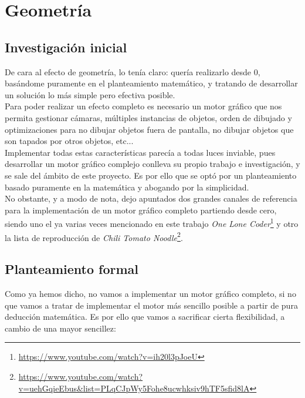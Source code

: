 \section{Geometría}


\subsection{Investigación inicial}

De cara al efecto de geometría, lo tenía claro: quería realizarlo desde 0, basándome puramente en el planteamiento matemático, y tratando de desarrollar un solución lo más simple pero efectiva posible.\\

Para poder realizar un efecto completo es necesario un motor gráfico que nos permita gestionar cámaras, múltiples instancias de objetos, orden de dibujado y optimizaciones para no dibujar objetos fuera de pantalla, no dibujar objetos que son tapados por otros objetos, etc...\\

Implementar todas estas características parecía a todas luces inviable, pues desarrollar un motor gráfico complejo conlleva su propio trabajo e investigación, y se sale del ámbito de este proyecto. Es por ello que se optó por un planteamiento basado puramente en la matemática y abogando por la simplicidad.\\

No obstante, y a modo de nota, dejo apuntados dos grandes canales de referencia para la implementación de un motor gráfico completo partiendo desde cero, siendo uno el ya varias veces mencionado en este trabajo \emph{One Lone Coder}\footnote{\url{https://www.youtube.com/watch?v=ih20l3pJoeU}} y otro la lista de reproducción de \emph{Chili Tomato Noodle}\footnote{\url{https://www.youtube.com/watch?v=uehGqieEbus&list=PLqCJpWy5Fohe8ucwhksiv9hTF5sfid8lA}}.

\subsection{Planteamiento formal}

Como ya hemos dicho, no vamos a implementar un motor gráfico completo, si no que vamos a tratar de implementar el motor más sencillo posible a partir de pura deducción matemática. Es por ello que vamos a sacrificar cierta flexibilidad, a cambio de una mayor sencillez:

